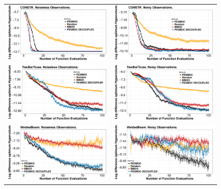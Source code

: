 \documentclass[review,preprint,12pt]{elsarticle}
\begin{document}
\begin{figure}[H]
        \begin{tabular}{cc}
                \vspace{-.2cm}
		\includegraphics[width=0.475\linewidth]{figures/benchmark/CONSTR.pdf} &
                \includegraphics[width=0.475\linewidth]{figures/benchmark/CONSTR_noisy.pdf} \\
		\includegraphics[width=0.475\linewidth]{figures/benchmark/TwoBarTruss.pdf} &
                \includegraphics[width=0.475\linewidth]{figures/benchmark/TwoBarTruss_noisy.pdf} \\
		\includegraphics[width=0.475\linewidth]{figures/benchmark/WeldedBeam.pdf} &
                \includegraphics[width=0.475\linewidth]{figures/benchmark/WeldedBeam_noisy.pdf} \\		

\end{tabular}
\end{figure}
\end{document}
